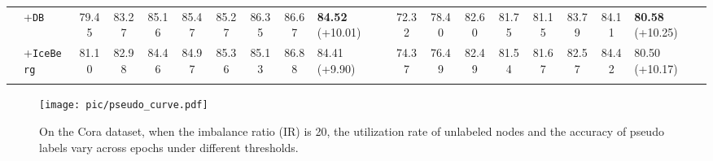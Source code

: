 \begin{table*}[]
{\begin{tabular}{ll|cccccccl|cccccccl}
\multicolumn{1}{l|}{}                           & +\texttt{DB}  & 79.45                        & 83.27                              & 85.16                       & 85.47         & 85.27             & 86.35                        & 86.67                        & \textbf{84.52} {\small(+10.01)}    & 72.32                        & 78.40                             & 82.60                       & 81.75           & 81.15           & 83.79                        & 84.11                        & \textbf{80.58} {\small(+10.25)}    \\
\multicolumn{1}{l|}{}                           & +\texttt{IceBerg} & 81.10                        & 82.98                       & 84.46                       & 84.97                       & 85.36                       & 85.13                        & 86.88                        & 84.41 {\small(+9.90)}    & 74.37                        & 76.49                       & 82.49                       & 81.54                       & 81.67                       & 82.57                        & 84.42                        & 80.50 {\small(+10.17)}    \\   \Xhline{1.2pt}
\end{tabular}}
\label{tab:cigl20}
\end{table*}


\begin{figure}[t]
\centering
\texttt{[image: pic/pseudo\_curve.pdf]}
\caption{On the Cora dataset, when the imbalance ratio (IR) is 20, the utilization rate of unlabeled nodes and the accuracy of pseudo labels vary across epochs under different thresholds.}
\label{fig:threshold}
\end{figure}


